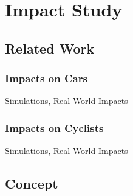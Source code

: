 \chapter{Impact Study}\label{ch:impacts}

\section{Related Work}

\subsection{Impacts on Cars}

Simulations, Real-World Impacts

\subsection{Impacts on Cyclists}

Simulations, Real-World Impacts

\section{Concept}
